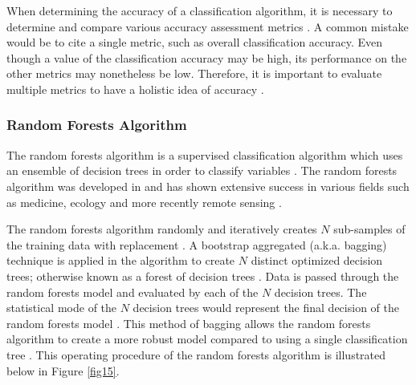 \justify
When determining the accuracy of a classification algorithm, it is necessary to determine and compare various accuracy assessment metrics \citep{banko1998}. A common mistake would be to cite a single metric, such as overall classification accuracy. Even though a value of the classification accuracy may be high, its performance on the other metrics may nonetheless be low. Therefore, it is important to evaluate multiple metrics to have a holistic idea of accuracy \citep{banko1998}.

\subsubsection{Random Forests Algorithm}

\justify
The random forests algorithm is a supervised classification algorithm which uses an ensemble of decision trees in order to classify variables \citep{Breiman2001}. The random forests algorithm was developed in \citet{Breiman2001} and has shown extensive success in various fields such as medicine, ecology and more recently remote sensing \citep{Machado2015, BELGIU201624}. 

\justify
The random forests algorithm randomly and iteratively creates $N$ sub-samples of the training data with replacement \citep{Breiman2001}. A bootstrap aggregated (a.k.a. bagging) technique is applied in the algorithm to create $N$ distinct optimized decision trees; otherwise known as a forest of decision trees \citep{Breiman2001}. Data is passed through the random forests model and evaluated by each of the $N$ decision trees. The statistical mode of the $N$ decision trees would represent the final decision of the random forests model \citep{Breiman2001}. This method of bagging allows the random forests algorithm to create a more robust model compared to using a single classification tree \citep{Breiman2001}. This operating procedure of the random forests algorithm is illustrated below in Figure \ref{fig15}.


